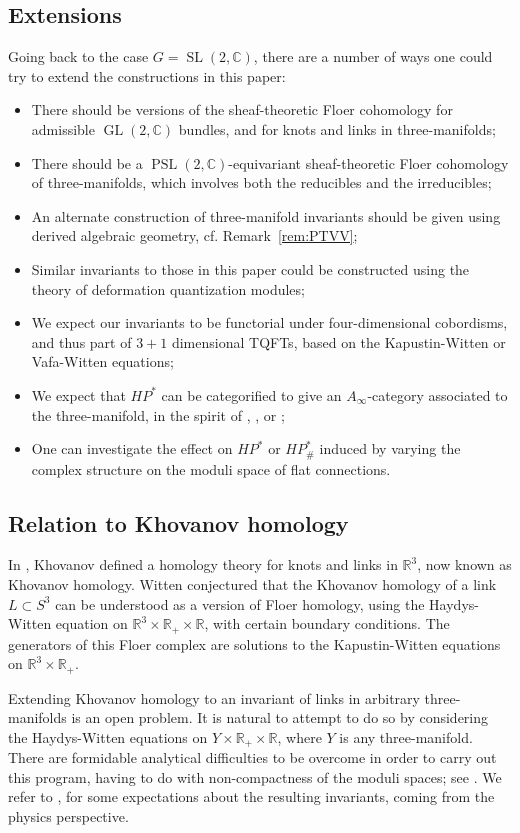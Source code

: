 \documentclass [11pt]{amsart}
\theoremstyle{remark}
\def\rr {{\mathbb{R}}}
\def\cc {{\mathbb{C}}}
\def\R{\rr}
\def\HP{\mathit{HP}}
\def\sl {{\operatorname{SL}(2, \cc)}}
\def\psl {{\operatorname{PSL}(2, \cc)}}
\def\gl{\operatorname{GL}(2, \cc)}
\begin{document}
\subsection{Extensions}
\label{sec:extensions}
Going back to the case $G=\sl$, there are a number of ways one could try to extend the constructions in this paper:
\begin{itemize}
\item There should be versions of the sheaf-theoretic Floer cohomology for admissible $\gl$ bundles, and for knots and links in three-manifolds;
\item
There should be a $\psl$-equivariant sheaf-theoretic Floer cohomology of three-manifolds, which involves both the reducibles and the irreducibles; 
\item
An alternate construction of three-manifold invariants should be given using derived algebraic geometry, cf. Remark~\ref{rem:PTVV}; 
\item
Similar invariants to those in this paper could be constructed using the theory of deformation quantization modules;
\item
We expect our invariants to be functorial under four-dimensional cobordisms, and thus part of  $3+1$ dimensional TQFTs, based on the Kapustin-Witten or Vafa-Witten equations; 
\item
We expect that $\HP^*$ can be categorified to give an $A_{\infty}$-category associated to the three-manifold, in the spirit of  \cite{KapustinRozansky}, \cite{Haydys}, or \cite{GMWfans};
\item
One can investigate the effect on $\HP^*$ or $\HP^*_{\#}$ induced by varying the complex structure on the moduli space of flat connections.
\end{itemize}


\subsection{Relation to Khovanov homology}
\label{sec:khovanov}
In \cite{Khovanov}, Khovanov defined a homology theory for knots and links in $\R^3$, now known as Khovanov homology.  Witten \cite{FiveBranes} conjectured that the Khovanov homology of a link $L \subset S^3$ can be understood as a version of Floer homology, using the Haydys-Witten equation on $\R^3 \times \R_+ \times \R$, with certain boundary conditions. The generators of this Floer complex are solutions to the Kapustin-Witten equations \cite{KapustinWitten} on $\R^3 \times \R_+$.

Extending Khovanov homology to an invariant of links in arbitrary three-manifolds is an open problem. It is natural to attempt to do so by considering the Haydys-Witten equations on $Y \times \R_+ \times \R$, where $Y$ is any three-manifold. There are formidable analytical difficulties to be overcome in order to carry out this program, having to do with non-compactness of the moduli spaces; see \cite{Taubes3, Taubes4, Taubes5}. We refer to \cite{GPV}, \cite{GPPV} for some expectations about the resulting invariants, coming from the physics perspective. 
\end{document}
